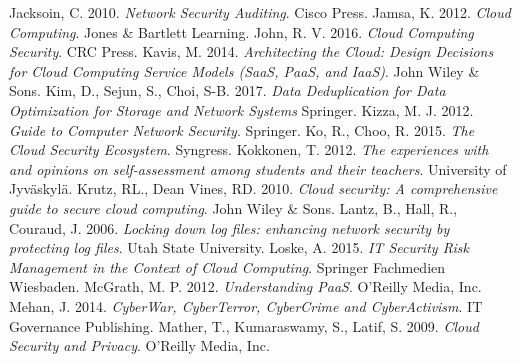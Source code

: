 \documentclass{article}
\begin{document}
\begin{thebibliography}{9}
        Jacksoin, C.
        2010.
       	\textit{Network Security Auditing}.
	Cisco Press.
        Jamsa, K.
        2012.
        \textit{Cloud Computing}.
	Jones \& Bartlett Learning.
        John, R. V.
        2016.
        \textit{Cloud Computing Security}.
	CRC Press.
	Kavis, M.
	2014.
	\textit{Architecting the Cloud: Design Decisions for Cloud Computing Service Models (SaaS, PaaS, and IaaS)}.
	John Wiley \& Sons.
        Kim, D.,
	Sejun, S.,
        Choi, S-B.
        2017.
	\textit{Data Deduplication for Data Optimization for Storage and Network Systems}
        Springer.
        Kizza, M. J.
        2012.
        \textit{Guide to Computer Network Security}.
	Springer.
        Ko, R.,
	Choo, R.
        2015.
        \textit{The Cloud Security Ecosystem}.
	Syngress.
        Kokkonen, T.
        2012.
        \textit{The experiences with and opinions on self-assessment among students and their teachers}.
	University of Jyväskylä.
        Krutz, RL.,
        Dean Vines, RD.
        2010.
        \textit{Cloud security: A comprehensive guide to secure cloud computing}.
	John Wiley \& Sons.
        Lantz, B.,
        Hall, R.,
        Couraud, J.
        2006.
        \textit{Locking down log files:  enhancing network security by protecting log files}.
	Utah State University.
        Loske, A.
        2015.
	\textit{IT Security Risk Management in the Context of Cloud Computing}.
        Springer Fachmedien Wiesbaden.
        McGrath, M. P.
        2012.
	\textit{Understanding PaaS}.
        O'Reilly Media, Inc.
	Mehan, J.
	2014.
	\textit{CyberWar, CyberTerror, CyberCrime and CyberActivism}.
	IT Governance Publishing.
        Mather, T.,
        Kumaraswamy, S.,
        Latif, S.
        2009.
	\textit{Cloud Security and Privacy}.
        O'Reilly Media, Inc.

\end{thebibliography}
\end{document}
